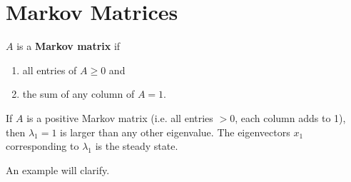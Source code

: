 \section{Markov Matrices}

 \begin{definition} $A$ is a \textbf{Markov matrix} if
     \begin{enumerate}
         \item all entries of $A \geq 0$ and
         \item the sum of any column of $A =1$.
     \end{enumerate}
\end{definition}

\begin{theorem}
    If $A$ is a positive Markov matrix (i.e. all entries $>0$, each column adds to 1), then $\lambda_1=1$ is larger than any other eigenvalue. The eigenvectors $x_1$ corresponding to $\lambda_1$ is the steady state.
\end{theorem}

An example will clarify.

